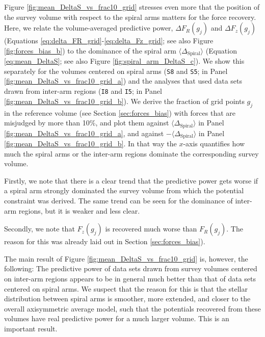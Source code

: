\documentclass[iop,revtex4,numberedappendix,appendixfloats]{emulateapj}
\newcommand{\hiddenComment}[1]{}
\begin{document}
Figure \ref{fig:mean_DeltaS_vs_frac10_grid} stresses even more that the position of the survey volume with respect to the spiral arms matters for the force recovery. Here, we relate the volume-averaged predictive power, $\Delta F_R(g_j)$ and $\Delta F_z(g_j)$ (Equations \eqref{eq:delta_FR_grid}-\eqref{eq:delta_Fz_grid}; see also Figure \ref{fig:forces_bias_b}) to the dominance of the spiral arm $\langle \Delta_\text{Spiral} \rangle$ (Equation \eqref{eq:mean_DeltaS}; see also Figure \ref{fig:spiral_arm_DeltaS_c}). We show this separately for the volumes centered on spiral arms (\texttt{S8} and \texttt{S5}; in Panel \ref{fig:mean_DeltaS_vs_frac10_grid_a}) and the analyses that used data sets drawn from inter-arm regions (\texttt{I8} and \texttt{I5}; in Panel \ref{fig:mean_DeltaS_vs_frac10_grid_b}). We derive the fraction of grid points $g_j$ in the reference volume (see Section \ref{sec:forces_bias}) with forces that are misjudged by more than 10\%, and plot them against $\langle \Delta_\text{Spiral} \rangle$ in Panel \ref{fig:mean_DeltaS_vs_frac10_grid_a}, and against $-\langle \Delta_\text{Spiral} \rangle$ in Panel \ref{fig:mean_DeltaS_vs_frac10_grid_b}. In that way the $x$-axis quantifies how much the spiral arms or the inter-arm regions dominate the corresponding survey volume. 

Firstly, we note that there is a clear trend that the predictive power gets worse if a spiral arm strongly dominated the survey volume from which the potential constraint was derived. The same trend can be seen for the dominance of inter-arm regions, but it is weaker and less clear.

Secondly, we note that $F_z(g_j)$ is recovered much worse than $F_R(g_j)$. The reason for this was already laid out in Section \ref{sec:forces_bias}). 

The main result of Figure \ref{fig:mean_DeltaS_vs_frac10_grid} is, however, the following: The predictive power of data sets drawn from survey volumes centered on inter-arm regions appears to be in general much better than that of data sets centered on spiral arms. We suspect that the reason for this is that the stellar distribution between spiral arms is smoother, more extended, and closer to the overall axisymmetric average model, such that the potentials recovered from these volumes have real predictive power for a much larger volume. This is an important result.

\hiddenComment{[TO DO: HW writes about the above discussion: "We should discuss this. I am still not 100\% sure I get the point. Is the fact that we predic the potential far away from most stars correctly a consequence of having used a clever functional form.." Jo writes: "Probably comes from the fact that the N-body model was setup with a simple model for the Milky Way. But I think we can just not discuss this in the current paper."]}
\end{document}
